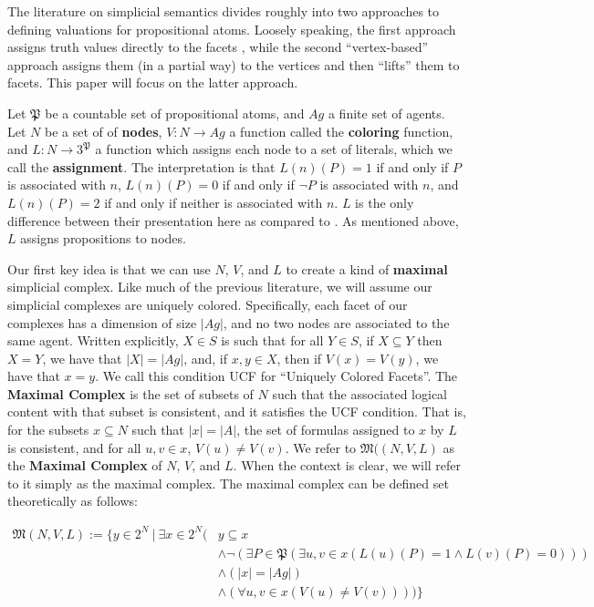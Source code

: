 \documentclass[11pt]{article}
\theoremstyle{definition}
\newcommand{\defin}[1]{\textbf{#1}}
\begin{document}
	The literature on simplicial semantics divides roughly into two approaches to defining valuations for propositional atoms. Loosely speaking, the first approach assigns truth values directly to the facets \cite{Death,FA,SimpSet},	while the second ``vertex-based'' approach assigns them (in a partial way) to the vertices and then ``lifts'' them to facets. \cite{DoA,KaSC,SimpDEL,HG} This paper will focus on the latter approach.
	
	Let $\mathfrak{P}$ be a countable set of propositional atoms, and $Ag$ a finite set of agents. Let $N$ be a set of of \defin{nodes}, $V:N\rightarrow Ag$ a function called the \defin{coloring} function, and $L:N\rightarrow 3^\mathfrak{P}$ a function which assigns each node to a set of literals, which we call the \defin{assignment}. The interpretation is that $L(n)(P)=1$ if and only if $P$ is associated with $n$, $L(n)(P)=0$ if and only if $\neg P$ is associated with $n$, and $L(n)(P)=2$ if and only if neither is associated with $n$. $L$ is the only difference between their presentation here as compared to \cite{BelSimp}. As mentioned above, $L$ assigns propositions to nodes.
	
	Our first key idea is that we can use $N$, $V$, and $L$ to create a kind of \defin{maximal} simplicial complex. Like much of the previous literature, we will assume our simplicial complexes are uniquely colored. Specifically, each facet of our complexes has a dimension of size $|Ag|$, and no two nodes are associated to the same agent. Written explicitly, $X\in S$ is such that for all $Y\in S$, if $X\subseteq Y$ then $X=Y$, we have that $|X|=|Ag|$, and, if $x,y\in X$, then if $V(x)=V(y)$, we have that $x=y$. We call this condition UCF for ``Uniquely Colored Facets''. The \defin{Maximal Complex} is the set of subsets of $N$ such that the associated logical content with that subset is consistent, and it satisfies the UCF condition. That is, for the subsets $x\subseteq N$ such that $|x|=|A|$, the set of formulas assigned to $x$ by $L$ is consistent, and for all $u,v\in x$, $V(u)\neq V(v)$. We refer to $\mathfrak{M}((N,V,L)$ as the \defin{Maximal Complex} of $N$, $V$, and $L$. When the context is clear, we will refer to it simply as the maximal complex. The maximal complex can be defined set theoretically as follows:
	
	\begin{align*}
		\mathfrak{M}(N,V,L):=\{y\in 2^N~|~\exists x\in 2^N (&y\subseteq x\\&\wedge\neg(\exists P\in\mathfrak{P}(\exists u,v\in x(L(u)(P)=1\wedge L(v)(P)=0))) \\&\wedge (|x|=|Ag|)
		\\&\wedge (\forall u,v\in x(V(u)\neq V(v))))\}
	\end{align*}
	
\end{document}

